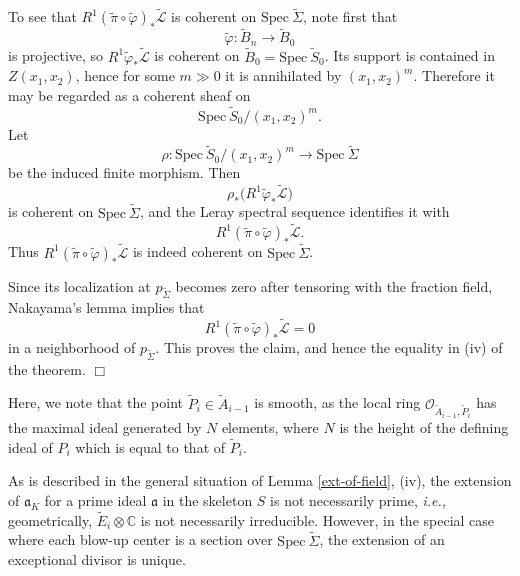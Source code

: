 \documentclass[a4paper]{amsart}
\def\CC{{\mathbb{C}}}
\renewcommand{\a}{{\mathfrak{a}}}
\newcommand{\p}{{\mathfrak{p}}}
\newcommand{\oo}{{\mathcal O}}
\newcommand{\spec}{{\mathrm{Spec \ }}}
\newcommand{\we}{{\widetilde E}}
\newcommand{\wa}{{\widetilde{A}}}
\newcommand{\wsig}{{\widetilde{\Sigma}}}
\newcommand{\tP}{{\widetilde{P}}}
\newcommand{\wv}{{\widetilde{\varphi}}}
\renewcommand{\L}{{\mathcal{L}}}
\newcommand{\wL}{{\widetilde{\L}}}
\theoremstyle{definition}
\begin{document}
To see that \(R^1(\widetilde{\pi}\circ\wv)_*\wL\) is coherent on
\(\spec \widetilde{\Sigma}\), note first that
\[
\wv : \widetilde{B}_n \to \widetilde{B}_0
\]
is projective, so \(R^1\wv_*\wL\) is coherent on
\(\widetilde{B}_0=\spec \widetilde{S}_0\). Its support is contained in
\(Z(x_1,x_2)\), hence for some \(m \gg 0\) it is annihilated by \((x_1,x_2)^m\).
Therefore it may be regarded as a coherent sheaf on
\[
\spec \widetilde{S}_0/(x_1,x_2)^m.
\]
Let
\[
\rho : \spec \widetilde{S}_0/(x_1,x_2)^m \to \spec \widetilde{\Sigma}
\]
be the induced finite morphism. Then
\[
\rho_*\bigl(R^1\wv_*\wL\bigr)
\]
is coherent on \(\spec \widetilde{\Sigma}\), and the Leray spectral sequence identifies
it with
\[
R^1(\widetilde{\pi}\circ\wv)_*\wL.
\]
Thus \(R^1(\widetilde{\pi}\circ\wv)_*\wL\) is indeed coherent on
\(\spec \widetilde{\Sigma}\).

Since its localization at \(p_{\widetilde{\Sigma}}\) becomes zero after tensoring with the
fraction field, Nakayama's lemma implies that
\[
R^1(\widetilde{\pi}\circ\wv)_*\wL=0
\]
in a neighborhood of \(p_{\widetilde{\Sigma}}\). This proves the claim, and hence the equality in (iv) of the
theorem. $\Box$


















  
      Here, we note that the point $\tP_i\in \wa_{i-1}$ is smooth,
       as the local ring $\oo_{\wa_{i-1},\tP_i }$ has the maximal ideal generated by $N$ elements, where
       $N$ is the height of the defining ideal of $P_i$ which is equal to that of $\tP_i$.
       
       As is described in the general situation of Lemma \ref{ext-of-field}, (iv), the extension of $\a_K$ for a prime ideal $\a$ in the skeleton $S$ 
       is not necessarily prime, {\it i.e.,} geometrically, $\we_i\otimes \CC$ is not necessarily irreducible.
       However, in the special case where each blow-up center is a section over $\spec \wsig$,  the extension of an exceptional divisor is unique.
     
\end{document}
